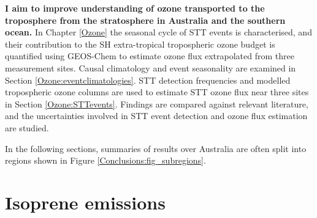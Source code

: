   \textbf{I aim to improve understanding of ozone transported to the troposphere from the stratosphere in Australia and the southern ocean.}
  In Chapter \ref{Ozone} the seasonal cycle of STT events is characterised, and their contribution to the SH extra-tropical tropospheric ozone budget is quantified using GEOS-Chem to estimate ozone flux extrapolated from three measurement sites.
  Causal climatology and event seasonality are examined in Section \ref{Ozone:eventclimatologies}.
  STT detection frequencies and modelled tropospheric ozone columns are used to estimate STT ozone flux near three sites in Section \ref{Ozone:STTevents}. 
  Findings are compared against relevant literature, and %
  the uncertainties involved in STT event detection and ozone flux estimation are studied.
  

  In the following sections, summaries of results over Australia are often split into regions shown in Figure \ref{Conclusions:fig_subregions}.
  

\section{Isoprene emissions}
\label{Conclusions:isoprene}

